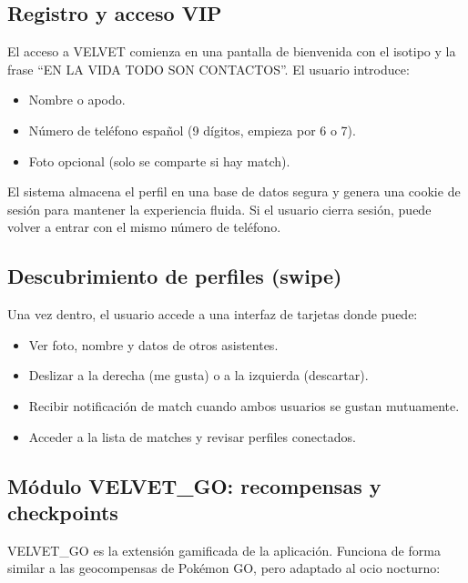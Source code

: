 \documentclass[11pt,a4paper]{article}
\begin{document}
\subsection{Registro y acceso VIP}

El acceso a VELVET comienza en una pantalla de bienvenida con el isotipo y la frase ``EN LA VIDA TODO SON CONTACTOS''. El usuario introduce:

\begin{itemize}[leftmargin=*]
  \item Nombre o apodo.
  \item Número de teléfono español (9 dígitos, empieza por 6 o 7).
  \item Foto opcional (solo se comparte si hay match).
\end{itemize}

El sistema almacena el perfil en una base de datos segura y genera una cookie de sesión para mantener la experiencia fluida. Si el usuario cierra sesión, puede volver a entrar con el mismo número de teléfono.

\subsection{Descubrimiento de perfiles (swipe)}

Una vez dentro, el usuario accede a una interfaz de tarjetas donde puede:

\begin{itemize}[leftmargin=*]
  \item Ver foto, nombre y datos de otros asistentes.
  \item Deslizar a la derecha (me gusta) o a la izquierda (descartar).
  \item Recibir notificación de match cuando ambos usuarios se gustan mutuamente.
  \item Acceder a la lista de matches y revisar perfiles conectados.
\end{itemize}

\subsection{Módulo VELVET\_GO: recompensas y checkpoints}

VELVET\_GO es la extensión gamificada de la aplicación. Funciona de forma similar a las geocompensas de Pokémon GO, pero adaptado al ocio nocturno:
\end{document}
